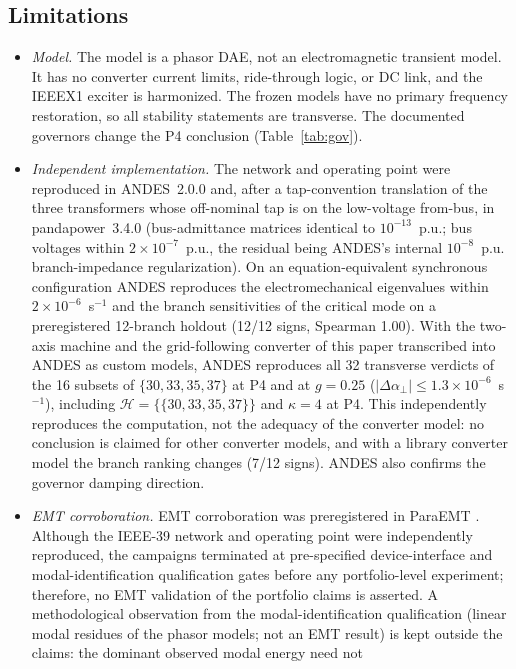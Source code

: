 \documentclass[journal]{IEEEtran}
\theoremstyle{definition}
\theoremstyle{remark}
\newcommand{\Hy}{\mathcal{H}}
\begin{document}
\subsection{Limitations}
\begin{itemize}
\item \emph{Model.} The model is a phasor DAE, not an electromagnetic transient
model. It has no converter current limits, ride-through logic, or DC link, and
the IEEEX1 exciter is harmonized. The frozen models have no primary frequency
restoration, so all stability statements are transverse. The documented
governors change the P4 conclusion (Table~\ref{tab:gov}).
\item \emph{Independent implementation.} The network and operating point were
reproduced in ANDES~2.0.0 and, after a tap-convention translation of the three
transformers whose off-nominal tap is on the low-voltage from-bus, in
pandapower~3.4.0 \cite{thurner2018pandapower} (bus-admittance matrices
identical to $10^{-13}$~p.u.; bus voltages within $2\times10^{-7}$~p.u., the
residual being ANDES's internal $10^{-8}$~p.u. branch-impedance
regularization). On an equation-equivalent synchronous configuration ANDES
reproduces the electromechanical eigenvalues within $2\times10^{-6}$~s$^{-1}$
and the branch sensitivities of the critical mode on a preregistered 12-branch
holdout (12/12 signs, Spearman 1.00). With the two-axis machine and the
grid-following converter of this paper transcribed into ANDES as custom
models, ANDES reproduces all 32 transverse verdicts of the 16 subsets of
$\{30,33,35,37\}$ at P4 and at $g=0.25$
($|\Delta\alpha_\perp|\le1.3\times10^{-6}$~s$^{-1}$), including
$\Hy=\{\{30,33,35,37\}\}$ and $\kappa=4$ at P4. This independently reproduces
the computation, not the adequacy of the converter model: no conclusion is
claimed for other converter models, and with a library converter model the
branch ranking changes (7/12 signs). ANDES also confirms the governor damping
direction.
\item \emph{EMT corroboration.} EMT corroboration was preregistered in ParaEMT
\cite{xiong2024paraemt}. Although the IEEE-39 network and operating point were
independently reproduced, the campaigns terminated at pre-specified
device-interface and modal-identification qualification gates before any
portfolio-level experiment; therefore, no EMT validation of the portfolio
claims is asserted. A methodological observation from the modal-identification
qualification (linear modal residues of the phasor models; not an EMT result)
is kept outside the claims: the dominant observed modal energy need not

\end{itemize}
\end{document}
